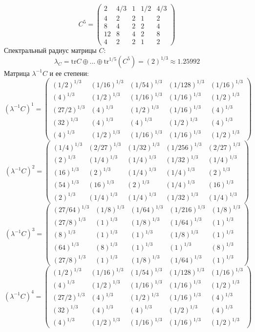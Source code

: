 $$C^5 = \begin{pmatrix}
2 & 4/3 & 1 & 1/2 & 4/3\\
4 & 2 & 2 & 1 & 2\\
8 & 4 & 2 & 2 & 4\\
12 & 8 & 4 & 2 & 8\\
4 & 2 & 2 & 1 & 2
\end{pmatrix}
$$
Спектральный радиус матрицы $C$:
$$\lambda_{C} = \mathrm{tr}C\oplus \dots \oplus \mathrm{tr}^{1/5}(C^{5}) = (2)^{1/3} \approx 1.25992$$
Матрица $\lambda^{-1}C$ и ее степени:
$$(\lambda^{-1}C)^1 = \begin{pmatrix}
(1/2)^{1/3} & (1/16)^{1/3} & (1/54)^{1/3} & (1/128)^{1/3} & (1/16)^{1/3}\\
(4)^{1/3} & (1/2)^{1/3} & (1/16)^{1/3} & (1/16)^{1/3} & (1/2)^{1/3}\\
(27/2)^{1/3} & (4)^{1/3} & (1/2)^{1/3} & (1/16)^{1/3} & (4)^{1/3}\\
(32)^{1/3} & (4)^{1/3} & (4)^{1/3} & (1/2)^{1/3} & (4)^{1/3}\\
(4)^{1/3} & (1/2)^{1/3} & (1/16)^{1/3} & (1/16)^{1/3} & (1/2)^{1/3}
\end{pmatrix}
$$
$$(\lambda^{-1}C)^2 = \begin{pmatrix}
(1/4)^{1/3} & (2/27)^{1/3} & (1/32)^{1/3} & (1/256)^{1/3} & (2/27)^{1/3}\\
(2)^{1/3} & (1/4)^{1/3} & (1/4)^{1/3} & (1/32)^{1/3} & (1/4)^{1/3}\\
(16)^{1/3} & (2)^{1/3} & (1/4)^{1/3} & (1/4)^{1/3} & (2)^{1/3}\\
(54)^{1/3} & (16)^{1/3} & (2)^{1/3} & (1/4)^{1/3} & (16)^{1/3}\\
(2)^{1/3} & (1/4)^{1/3} & (1/4)^{1/3} & (1/32)^{1/3} & (1/4)^{1/3}
\end{pmatrix}
$$
$$(\lambda^{-1}C)^3 = \begin{pmatrix}
(27/64)^{1/3} & (1/8)^{1/3} & (1/64)^{1/3} & (1/216)^{1/3} & (1/8)^{1/3}\\
(27/8)^{1/3} & (1)^{1/3} & (1/8)^{1/3} & (1/64)^{1/3} & (1)^{1/3}\\
(8)^{1/3} & (1)^{1/3} & (1)^{1/3} & (1/8)^{1/3} & (1)^{1/3}\\
(64)^{1/3} & (8)^{1/3} & (1)^{1/3} & (1)^{1/3} & (8)^{1/3}\\
(27/8)^{1/3} & (1)^{1/3} & (1/8)^{1/3} & (1/64)^{1/3} & (1)^{1/3}
\end{pmatrix}
$$
$$(\lambda^{-1}C)^4 = \begin{pmatrix}
(1/2)^{1/3} & (1/16)^{1/3} & (1/54)^{1/3} & (1/128)^{1/3} & (1/16)^{1/3}\\
(4)^{1/3} & (1/2)^{1/3} & (1/16)^{1/3} & (1/16)^{1/3} & (1/2)^{1/3}\\
(27/2)^{1/3} & (4)^{1/3} & (1/2)^{1/3} & (1/16)^{1/3} & (4)^{1/3}\\
(32)^{1/3} & (4)^{1/3} & (4)^{1/3} & (1/2)^{1/3} & (4)^{1/3}\\
(4)^{1/3} & (1/2)^{1/3} & (1/16)^{1/3} & (1/16)^{1/3} & (1/2)^{1/3}
\end{pmatrix}
$$

